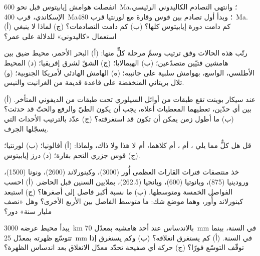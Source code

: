 \begin{exercise}[$\star$]\label{exo:b2:wilson-cycle:1}
انفصلت هوامش إيابيتوس قبل نحو \qty{600}{Ma}؛ وانتهى التصادم الكاليدوني الرئيسي،
الإسكاندي، قرب \qty{400}{Ma}؛ وبدأ أول تصادم بين قوس وقارة مع لورنتيا
قرب \qty{480}{Ma}. (أ) كم دامت دورة إيابيتوس كلها؟ (ب) كم دامت
التصادمات؟ (ج) لماذا لا ينبغي استعمال «كاليدوني» للدلالة على عمر؟
\end{exercise}

\begin{exercise}[$\star$]\label{exo:b2:wilson-cycle:2}
رتّب هذه الحالات وفق ترتيب  وسمِّ مرحلة كلٍّ منها: (أ)
البحر الأحمر، محيط ضيق بين هامشين فتيّين متصدّعين؛ (ب) الهيمالايا؛ (ج) الشقّ
لشرق إفريقيا؛ (د) المحيط الأطلسي، الواسع، بهوامش سلبية على جانبيه؛ (ه) الهامش الهادئي
لأمريكا الجنوبية؛ (و) تلال بريتاني المنخفضة على قاعدة قديمة من الغرانيت والنيس.
\end{exercise}

\begin{exercise}[$\star$]\label{exo:b2:wilson-cycle:3}
عند سيكار بوينت تقع طبقات من أوائل السيلوري تحت طبقات من الديفوني المتأخر. (أ) بين أي حدّين،
تعطيهما المعطيات أعلاه، يجب أن يكون الطيّ والرفع والحتّ قد حدثت؟ (ب) ما
أطول زمن يمكن أن تكون قد استغرقته؟ (ج) عدّد بالترتيب الأحداث التي يسجّلها الجرف.
\end{exercise}

\begin{exercise}[$\star$]\label{exo:b2:wilson-cycle:4}
قل هل كلٌّ مما يلي ، أم ، أم كلاهما، أم لا هذا ولا ذاك، ولماذا: (أ) أفالونيا؛
(ب) لورنتيا؛ (ج) قوس جزري التحم بقارة؛ (د) درز إيابيتوس.
\end{exercise}

\begin{exercise}[$\star\star$]\label{exo:b2:wilson-cycle:5}
خذ منتصفات فترات القارات العظمى أُور (3000)، وكينورلاند (2600)،
ونونا (1500)، ورودينيا (875)، وبانوتيا (600)، وبانجيا (262.5)، بملايين السنين قبل الحاضر.
(أ) احسب الفواصل الخمسة ومتوسطها. (ب) ما نسبة أكبر فاصل إلى
أصغرها؟ (ج) استبعد كينورلاند وأُور، وهما موضع شك: ما متوسط الفاصل بين
الأربع الأخرى؟ وهل «نصف مليار سنة» دور؟
\end{exercise}

\begin{exercise}[$\star\star$]\label{exo:b2:wilson-cycle:6}
يبدأ محيط عرضه \qty{3000}{km} بالاندساس عند أحد هامشيه بمعدّل \qty{70}{mm} في السنة،
بينما تتوسّع ظهرته بمعدّل \qty{25}{mm} في السنة. (أ) كم يستغرق انغلاقه؟
(ب) وكم يستغرق إذا توقّف التوسّع فورًا؟ (ج) حركة أي صفيحة تحدّد معدّل الانغلاق بعد
اندساس الظهرة؟
\end{exercise}

